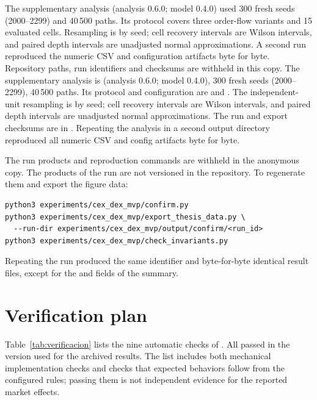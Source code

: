 \ifdefined\blindreviewmode
The supplementary analysis (analysis 0.6.0; model 0.4.0) used 300 fresh seeds (2000--2299) and 40\,500 paths. Its protocol covers three order-flow variants and 15 evaluated cells. Resampling is by seed; cell recovery intervals are Wilson intervals, and paired depth intervals are unadjusted normal approximations. A second run reproduced the numeric CSV and configuration artifacts byte for byte. Repository paths, run identifiers and checksums are withheld in this copy.
\else
The supplementary analysis is  (analysis 0.6.0; model 0.4.0), 300 fresh seeds (2000--2299), 40\,500 paths. Its protocol and configuration are  and . The independent-unit resampling is by seed; cell recovery intervals are Wilson intervals, and paired depth intervals are unadjusted normal approximations. The run and export checksums are in . Repeating the analysis in a second output directory reproduced all numeric CSV and config artifacts byte for byte.

\fi
\ifdefined\blindreviewmode
The run products and reproduction commands are withheld in the anonymous copy.
\else
The products of the run are not versioned in the repository. To regenerate them and export the figure data:

\begin{verbatim}
python3 experiments/cex_dex_mvp/confirm.py
python3 experiments/cex_dex_mvp/export_thesis_data.py \
  --run-dir experiments/cex_dex_mvp/output/confirm/<run_id>
python3 experiments/cex_dex_mvp/check_invariants.py
\end{verbatim}
\fi

Repeating the run produced the same identifier and byte-for-byte identical result files, except for the  and  fields of the summary.

\section{Verification plan}
\label{sec:verificacion}

Table~\ref{tab:verificacion} lists the nine automatic checks of . All passed in the version used for the archived results. The list includes both mechanical implementation checks and checks that expected behaviors follow from the configured rules; passing them is not independent evidence for the reported market effects.

